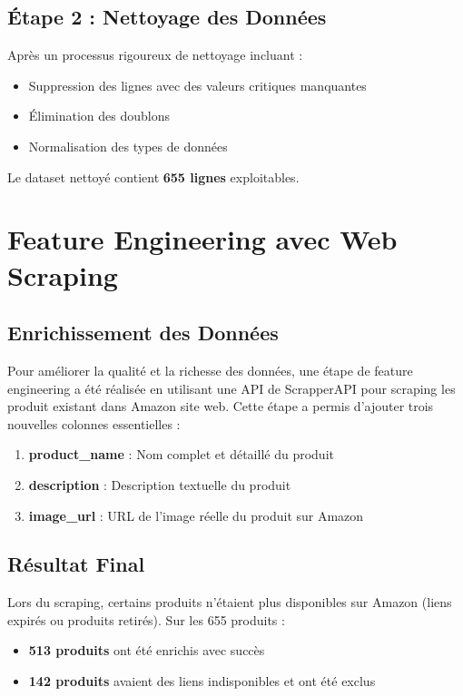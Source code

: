 \documentclass[12pt,a4paper]{report}
\begin{document}
\subsection{Étape 2 : Nettoyage des Données}

Après un processus rigoureux de nettoyage incluant :

\begin{itemize}[noitemsep]
    \item Suppression des lignes avec des valeurs critiques manquantes
    \item Élimination des doublons
    \item Normalisation des types de données
\end{itemize}

Le dataset nettoyé contient \textbf{655 lignes} exploitables.

\section{Feature Engineering avec Web Scraping}

\subsection{Enrichissement des Données}

Pour améliorer la qualité et la richesse des données, une étape de feature engineering a été réalisée en utilisant une API de ScrapperAPI pour scraping les produit existant dans  Amazon site web. Cette étape a permis d'ajouter trois nouvelles colonnes essentielles :

\begin{enumerate}[noitemsep]
    \item \textbf{product\_name} : Nom complet et détaillé du produit
    \item \textbf{description} : Description textuelle du produit
    \item \textbf{image\_url} : URL de l'image réelle du produit sur Amazon
\end{enumerate}

\subsection{Résultat Final}

Lors du scraping, certains produits n'étaient plus disponibles sur Amazon (liens expirés ou produits retirés). Sur les 655 produits :

\begin{itemize}[noitemsep]
    \item \textbf{513 produits} ont été enrichis avec succès
    \item \textbf{142 produits} avaient des liens indisponibles et ont été exclus
\end{itemize}
\end{document}
